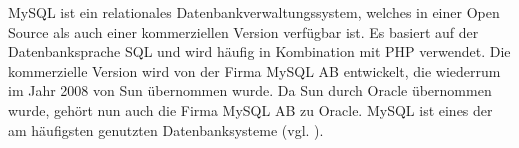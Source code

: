 MySQL ist ein relationales Datenbankverwaltungssystem, welches in einer Open Source als auch einer kommerziellen Version verfügbar ist. Es basiert auf der Datenbanksprache \ac{SQL} und wird häufig in Kombination mit \ac{PHP} verwendet. Die kommerzielle Version wird von der Firma MySQL AB entwickelt, die wiederrum im Jahr 2008 von Sun übernommen wurde. Da Sun durch Oracle übernommen wurde, gehört nun auch die Firma MySQL AB zu Oracle. MySQL ist eines der am häufigsten genutzten Datenbanksysteme (vgl. \cite{.q}\cite{Horn.12.03.2017}).